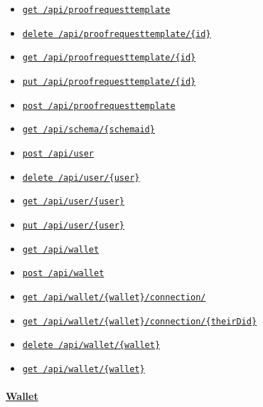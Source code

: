 \begin{itemize}
\item
  \protect\hyperlink{apiProofrequesttemplateGet}{\texttt{get\ /api/proofrequesttemplate}}
\item
  \protect\hyperlink{apiProofrequesttemplateIdDelete}{\texttt{delete\ /api/proofrequesttemplate/\{id\}}}
\item
  \protect\hyperlink{apiProofrequesttemplateIdGet}{\texttt{get\ /api/proofrequesttemplate/\{id\}}}
\item
  \protect\hyperlink{apiProofrequesttemplateIdPut}{\texttt{put\ /api/proofrequesttemplate/\{id\}}}
\item
  \protect\hyperlink{apiProofrequesttemplatePost}{\texttt{post\ /api/proofrequesttemplate}}
\item
  \protect\hyperlink{apiSchemaSchemaidGet}{\texttt{get\ /api/schema/\{schemaid\}}}
\item
  \protect\hyperlink{apiUserPost}{\texttt{post\ /api/user}}
\item
  \protect\hyperlink{apiUserUserDelete}{\texttt{delete\ /api/user/\{user\}}}
\item
  \protect\hyperlink{apiUserUserGet}{\texttt{get\ /api/user/\{user\}}}
\item
  \protect\hyperlink{apiUserUserPut}{\texttt{put\ /api/user/\{user\}}}
\item
  \protect\hyperlink{apiWalletGet}{\texttt{get\ /api/wallet}}
\item
  \protect\hyperlink{apiWalletPost}{\texttt{post\ /api/wallet}}
\item
  \protect\hyperlink{apiWalletWalletConnectionGet}{\texttt{get\ /api/wallet/\{wallet\}/connection/}}
\item
  \protect\hyperlink{apiWalletWalletConnectionTheirDidGet}{\texttt{get\ /api/wallet/\{wallet\}/connection/\{theirDid\}}}
\item
  \protect\hyperlink{apiWalletWalletDelete}{\texttt{delete\ /api/wallet/\{wallet\}}}
\item
  \protect\hyperlink{apiWalletWalletGet}{\texttt{get\ /api/wallet/\{wallet\}}}
\end{itemize}

\hypertarget{wallet}{%
\paragraph{\texorpdfstring{\protect\hyperlink{Wallet}{Wallet}}{Wallet}}\label{wallet}}

